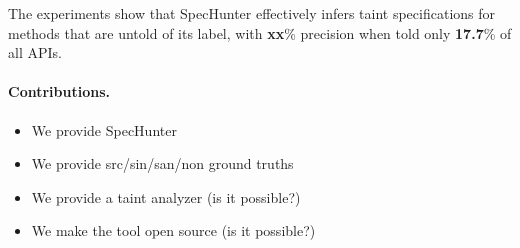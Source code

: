 The experiments show that SpecHunter effectively infers taint specifications for
methods that are untold of its label, with \textbf{xx}\% precision when told only
\textbf{17.7}\% of all APIs.


\paragraph{Contributions.}

\begin{itemize}
  \item We provide SpecHunter
  \item We provide src/sin/san/non ground truths
  \item We provide a taint analyzer (is it possible?)
  \item We make the tool open source (is it possible?)
\end{itemize}
